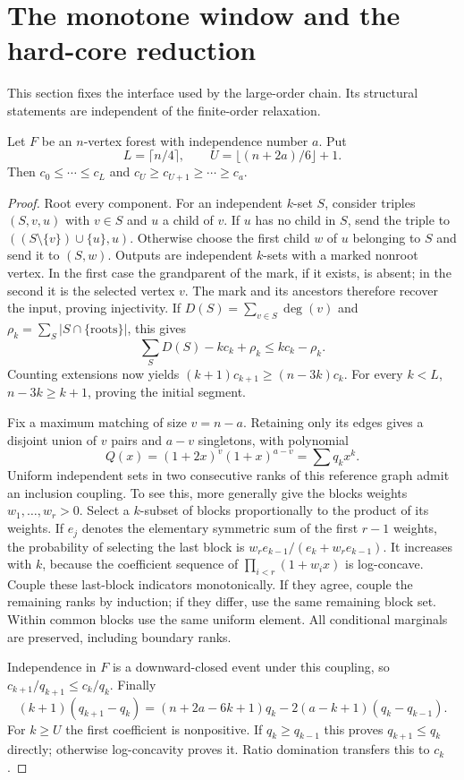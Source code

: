 \section{The monotone window and the hard-core reduction}\label{sec:window}
This section fixes the interface used by the large-order chain. Its structural statements are independent of the finite-order relaxation.

\begin{lemma}\label{l59:window}
Let $F$ be an $n$-vertex forest with independence number $a$. Put
\[
 L=\lceil n/4\rceil,\qquad U=\lfloor(n+2a)/6\rfloor+1.
\]
Then $c_0\le\cdots\le c_L$ and $c_U\ge c_{U+1}\ge\cdots\ge c_a$.
\end{lemma}
\begin{proof}
Root every component. For an independent $k$-set $S$, consider triples $(S,v,u)$ with $v\in S$ and $u$ a child of $v$. If $u$ has no child in $S$, send the triple to $((S\setminus\{v\})\cup\{u\},u)$. Otherwise choose the first child $w$ of $u$ belonging to $S$ and send it to $(S,w)$. Outputs are independent $k$-sets with a marked nonroot vertex. In the first case the grandparent of the mark, if it exists, is absent; in the second it is the selected vertex $v$. The mark and its ancestors therefore recover the input, proving injectivity. If $D(S)=\sum_{v\in S}\deg(v)$ and $\rho_k=\sum_S|S\cap\{\text{roots}\}|$, this gives
\[
 \sum_S D(S)-kc_k+\rho_k\le kc_k-\rho_k.
\]
Counting extensions now yields $(k+1)c_{k+1}\ge(n-3k)c_k$. For every $k<L$, $n-3k\ge k+1$, proving the initial segment.

Fix a maximum matching of size $v=n-a$. Retaining only its edges gives a disjoint union of $v$ pairs and $a-v$ singletons, with polynomial
\[
 Q(x)=(1+2x)^v(1+x)^{a-v}=\sum q_kx^k.
\]
Uniform independent sets in two consecutive ranks of this reference graph admit an inclusion coupling. To see this, more generally give the blocks weights $w_1,\ldots,w_r>0$. Select a $k$-subset of blocks proportionally to the product of its weights. If $e_j$ denotes the elementary symmetric sum of the first $r-1$ weights, the probability of selecting the last block is $w_re_{k-1}/(e_k+w_re_{k-1})$. It increases with $k$, because the coefficient sequence of $\prod_{i<r}(1+w_ix)$ is log-concave. Couple these last-block indicators monotonically. If they agree, couple the remaining ranks by induction; if they differ, use the same remaining block set. Within common blocks use the same uniform element. All conditional marginals are preserved, including boundary ranks.

Independence in $F$ is a downward-closed event under this coupling, so $c_{k+1}/q_{k+1}\le c_k/q_k$. Finally
\[
 (k+1)(q_{k+1}-q_k)
 =(n+2a-6k+1)q_k-2(a-k+1)(q_k-q_{k-1}).
\]
For $k\ge U$ the first coefficient is nonpositive. If $q_k\ge q_{k-1}$ this proves $q_{k+1}\le q_k$ directly; otherwise log-concavity proves it. Ratio domination transfers this to $c_k$.
\end{proof}

